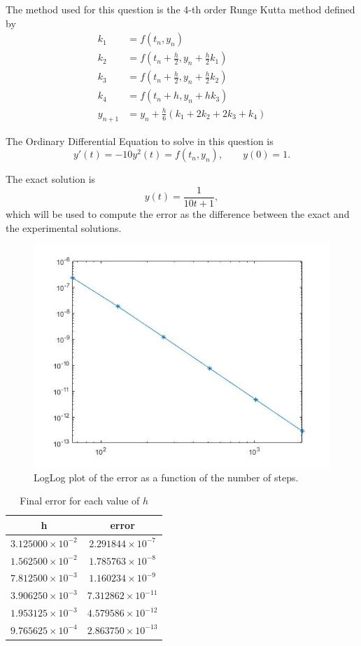 \documentclass[a4paper, 11pt]{article}
\begin{document}
		The method used for this question is the 4-th order Runge Kutta method defined by
		\begin{align}
			k_1 &= f(t_n,y_n) \\
			k_2 &= f\left(t_n+\frac{h}{2},y_n + \frac{h}{2}k_1\right) \\
			k_3 &= f\left(t_n+\frac{h}{2},y_n + \frac{h}{2}k_2\right)\\
			k_4 &= f\left(t_n+h,y_n + hk_3\right) \\
			y_{n+1} &= y_n + \frac{h}{6} \left(k_1 + 2k_2 + 2k_3 + k_4 \right)
		\end{align}
	
		The Ordinary Differential Equation to solve in this question is 
		\begin{equation}
			y'(t) = -10y^2(t) = f(t_n,y_n),	\qquad y(0) =1.
		\end{equation}
	
		The exact solution is 
		\begin{equation}
			y(t) = \frac{1}{10t + 1},
		\end{equation}
		which will be used to compute the error as the difference between the exact and the experimental solutions.
		
		\begin{figure}[H]
			\centering
			\includegraphics[width=.6\linewidth]{ex2.jpg}
			\caption{LogLog plot of the error as a function of the number of steps.}
			\label{fig:ex2}
		\end{figure}
		
		\begin{table}[H]
			\centering
			\begin{tabular}{c|c}
				\textbf{h}& \textbf{error}   \\ \hline
				$ 3.125000\times 10^{-2} $ & $ 2.291844\times 10^{-7} $ \\ \hline
				$ 1.562500\times 10^{-2} $ & $ 1.785763\times 10^{-8} $ \\ \hline
				$ 7.812500\times 10^{-3} $ & $ 1.160234\times 10^{-9} $ \\ \hline
				$ 3.906250\times 10^{-3} $ & $ 7.312862\times 10^{-11} $ \\ \hline
				$ 1.953125\times 10^{-3} $ & $ 4.579586\times 10^{-12} $ \\ \hline
				$ 9.765625\times 10^{-4} $ & $ 2.863750\times 10^{-13} $ \\ \hline	
			\end{tabular}
			\caption{Final error for each value of $h$}
			\label{table:ex2}
		\end{table}
	
\end{document}
